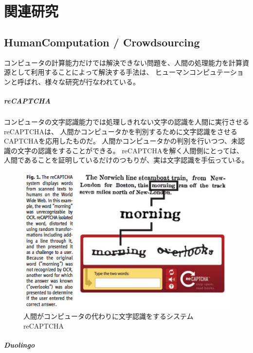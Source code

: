 \chapter{関連研究}\label{chap:related}

\section{HumanComputation /
Crowdsourcing}\label{humancomputation-crowdsourcing}

コンピュータの計算能力だけでは解決できない問題を、人間の処理能力を計算資源として利用することによって解決する手法は、
ヒューマンコンピュテーション\cite{humancomputation}と呼ばれ、様々な研究が行なわれている。

\paragraph{reCAPTCHA}\label{recaptcha}

\mbox{}

コンピュータの文字認識能力では処理しきれない文字の認識を人間に実行させるreCAPTCHA\cite{recaptcha}は、
人間かコンピュータかを判別するために文字認識をさせるCAPTCHA\cite{captcha}を応用したものだ。
人間かコンピュータかの判別を行いつつ、未認識の文字の認識をすることができる。
reCAPTCHAを解く人間側にとっては、人間であることを証明しているだけのつもりが、実は文字認識を手伝っている。

\begin{figure}[htbp]
  \begin{center}
  \includegraphics[width=.5\linewidth,bb=0 0 476 316]{images/recaptcha.png}
  \end{center}
  \caption{人間がコンピュータの代わりに文字認識をするシステム reCAPTCHA}
  \label{fig:recaptcha}
\end{figure}

\paragraph{Duolingo}\label{duolingo}

